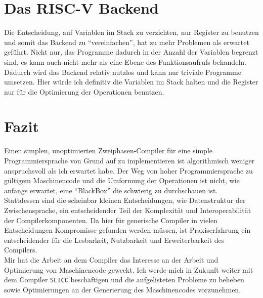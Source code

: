 \section{Das RISC-V Backend}

Die Entscheidung, auf Variablen im Stack zu verzichten, nur Register zu benutzen und somit das Backend zu ``vereinfachen'', hat zu mehr Problemen als erwartet geführt.
Nicht nur, das Programme dadurch in der Anzahl der Variablen begrenzt sind, es kann auch nicht mehr als eine Ebene des Funktionsaufrufs behandeln.\\
Dadurch wird das Backend relativ nutzlos und kann nur triviale Programme umsetzen.
Hier würde ich definitiv die Variablen im Stack halten und die Register nur für die Optimierung der Operationen benutzen.\\

\section{Fazit}

Einen simplen, unoptimierten Zweiphasen-Compiler für eine simple Programmiersprache von Grund auf zu implementieren ist algorithmisch weniger anspruchsvoll als ich erwartet habe.
Der Weg von hoher Programmiersprache zu gültigem Maschinencode und die Umformung der Operationen ist nicht, wie anfangs erwartet, eine ``BlackBox'' die schwierig zu durchschauen ist.\\
Stattdessen sind die scheinbar kleinen Entscheidungen, wie Datenstruktur der Zwischensprache, ein entscheidender Teil der
Komplexität und Interoperabilität der Compilerkomponenten.
Da hier für generische Compiler in vielen Entscheidungen Kompromisse gefunden werden müssen, ist Praxiserfahrung ein entscheidender für die Lesbarkeit, Nutzbarkeit und Erweiterbarkeit des Compilers.\\

Mir hat die Arbeit an dem Compiler das Interesse an der Arbeit und Optimierung von Maschinencode geweckt.
Ich werde mich in Zukunft weiter mit dem Compiler \texttt{SLICC} beschäftigen und die aufgelisteten Probleme zu beheben sowie Optimierungen an der Generierung des Maschinencodes vorzunehmen.\\
